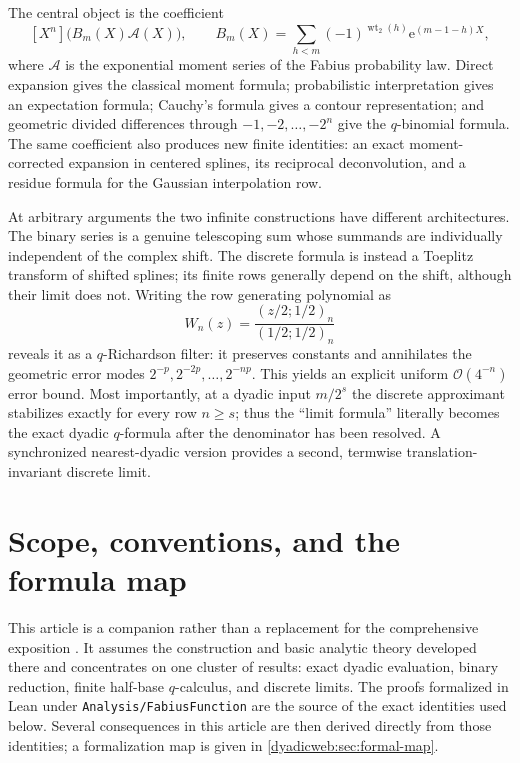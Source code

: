 \documentclass[11pt,oneside]{article}
\theoremstyle{definition}
\theoremstyle{remark}
\newcommand{\wt}{\operatorname{wt}_2}
\newcommand{\e}{\mathrm e}
\newcommand{\bigO}{\mathcal O}
\newcommand{\repo}{\nolinkurl{Analysis/FabiusFunction}}
\begin{document}
The central object is the coefficient
\[
 [X^n]\bigl(B_m(X)\mathscr A(X)\bigr),
 \qquad
 B_m(X)=\sum_{h<m}(-1)^{\wt(h)}\e^{(m-1-h)X},
\]
where $\mathscr A$ is the exponential moment series of the Fabius probability law.  Direct
expansion gives the classical moment formula; probabilistic interpretation gives an
expectation formula; Cauchy's formula gives a contour representation; and geometric divided
differences through $-1,-2,\ldots,-2^n$ give the $q$-binomial formula.  The same coefficient
also produces new finite identities: an exact moment-corrected expansion in centered splines,
its reciprocal deconvolution, and a residue formula for the Gaussian interpolation row.

At arbitrary arguments the two infinite constructions have different architectures.  The
binary series is a genuine telescoping sum whose summands are individually independent of the
complex shift.  The discrete formula is instead a Toeplitz transform of shifted splines; its
finite rows generally depend on the shift, although their limit does not.  Writing the row
generating polynomial as
\[
 W_n(z)=\frac{(z/2;1/2)_n}{(1/2;1/2)_n}
\]
reveals it as a $q$-Richardson filter: it preserves constants and annihilates the geometric
error modes $2^{-p},2^{-2p},\ldots,2^{-np}$.  This yields an explicit uniform
$\bigO(4^{-n})$ error bound.  Most importantly, at a dyadic input $m/2^s$ the discrete
approximant stabilizes exactly for every row $n\ge s$; thus the ``limit formula'' literally
becomes the exact dyadic $q$-formula after the denominator has been resolved.  A synchronized
nearest-dyadic version provides a second, termwise translation-invariant discrete limit.


\section{Scope, conventions, and the formula map}
\label{dyadicweb:sec:scope}

This article is a companion rather than a replacement for the comprehensive exposition
\cite{dyadicweb:mainarticle}.  It assumes the construction and basic analytic theory developed there
and concentrates on one cluster of results: exact dyadic evaluation, binary reduction, finite
half-base $q$-calculus, and discrete limits.  The proofs formalized in Lean under \repo
\cite{dyadicweb:proveit} are the source of the exact identities used below.  Several consequences in
this article are then derived directly from those identities; a formalization map is given in
\cref{dyadicweb:sec:formal-map}.
\end{document}
